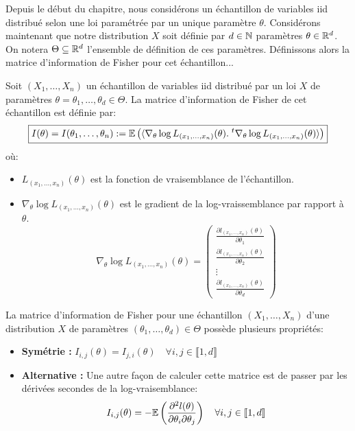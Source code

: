 Depuis le début du chapitre, nous considérons un échantillon de variables iid distribué selon une loi paramétrée par 
un unique paramètre $\theta$. Considérons maintenant que notre distribution $X$ soit définie par $d \in \mathbb{N}$ paramètres 
$ \theta \in \mathbb{R}^d$. On notera $\Theta \subseteq \mathbb{R}^d$ l'ensemble de définition de ces paramètres. 
Définissons alors la matrice d'information de Fisher pour cet échantillon... 

\begin{definition}
    Soit $(X_1, \dots, X_n)$ un échantillon de variables iid distribué par un loi $X$ de 
    paramètres $\theta = \theta_1, \dots, \theta_d \in \Theta$. La matrice d'information de Fisher de cet échantillon est définie par: 
        \[  \boxed{ I(\theta) = I(\theta_1, \dots, \theta_n) := \mathbb{E} \left( \langle \nabla_\theta \log L_{(x_1, \dots, x_n)} (\theta) . 
            \; ^t \nabla_\theta \log L_{(x_1, \dots, x_n)} (\theta) \rangle \right)} \] 
        où: 
        \begin{itemize}
            \item $L_{(x_1, \dots, x_n)} (\theta)$ est la fonction de vraisemblance de l'échantillon. 
            \item $\nabla_\theta \log L_{(x_1, \dots, x_n)} (\theta)$ est le gradient de la log-vraissemblance par rapport à $\theta$. 
                \[ \nabla_\theta \log L_{(x_1, \dots, x_n)} (\theta) = 
                    \begin{pmatrix}
                        \frac{\partial l_{(x_1, \dots, x_n)}(\theta)}{\partial \theta_1} \\ 
                        \frac{\partial l_{(x_1, \dots, x_n)}(\theta)}{\partial \theta_2} \\ 
                        \vdots \\ 
                        \frac{\partial l_{(x_1, \dots, x_n)}(\theta)}{\partial \theta_d}
                    \end{pmatrix}
                \]
        \end{itemize}
\end{definition}

\begin{prop}
    La matrice d'information de Fisher pour une échantillon $(X_1, \dots, X_n)$  d'une distribution $X$ de paramètres 
    $(\theta_1, \dots, \theta_d) \in \Theta $ possède plusieurs propriétés: 
    \begin{itemize}
        \item \textbf{Symétrie :} $I_{i,j} (\theta) = I_{j,i}(\theta) \quad \forall i,j \in \llbracket 1, d \rrbracket $ 
        \item \textbf{Alternative : } Une autre façon de calculer cette matrice est de passer par les dérivées secondes 
        de la log-vraisemblance: 
            \[ I_{i,j}(\theta) = - \mathbb{E} \left( \frac{\partial^2 l(\theta)}{\partial \theta_i \partial \theta_j} \right) \quad \forall i,j \in \llbracket 1, d \rrbracket \] 
    \end{itemize}
\end{prop}

